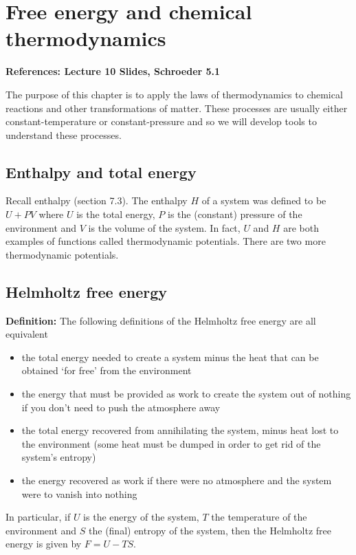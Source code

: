 \documentclass[11pt]{article}
\begin{document}
\section{Free energy and chemical thermodynamics}
\textbf{References: Lecture 10 Slides, Schroeder 5.1}

The purpose of this chapter is to apply the laws of thermodynamics to chemical reactions and other transformations of matter. These processes are usually either constant-temperature or constant-pressure and so we will develop tools to understand these processes. 

\subsection{Enthalpy and total energy}

Recall enthalpy (section 7.3). The enthalpy $H$ of a system was defined to be $U + PV$ where $U$ is the total energy, $P$ is the (constant) pressure of the environment and $V$ is the volume of the system. In fact, $U$ and $H$ are both examples of functions called thermodynamic potentials. There are two more thermodynamic potentials. 

\subsection{Helmholtz free energy}
\textbf{Definition:} The following definitions of the Helmholtz free energy are all equivalent 
\begin{itemize}
    \item the total energy needed to create a system minus the heat that can be obtained `for free' from the environment
    \item the energy that must be provided as work to create the system out of nothing if you don't need to push the atmosphere away
    \item the total energy recovered from annihilating the system, minus heat lost to the environment (some heat must be dumped in order to get rid of the system's entropy) 
    \item the energy recovered as work if there were no atmosphere and the system were to vanish into nothing
\end{itemize}
In particular, if $U$ is the energy of the system, $T$ the temperature of the environment and $S$ the (final) entropy of the system, then the Helmholtz free energy is given by $F = U - TS$.
\end{document}
